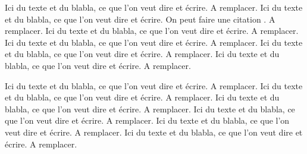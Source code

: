 Ici du texte et du blabla, ce que l'on veut dire et écrire. A remplacer. Ici du texte et du blabla, ce que l'on veut dire et écrire. On peut faire une citation \cite{Motclef1}.
A remplacer. Ici du texte et du blabla, ce que l'on veut dire et écrire. A remplacer. Ici du texte et du blabla, ce que l'on veut dire et écrire. A remplacer. Ici du texte et du blabla, ce que l'on veut dire et écrire. A remplacer. Ici du texte et du blabla, ce que l'on veut dire et écrire. A remplacer.

Ici du texte et du blabla, ce que l'on veut dire et écrire. A remplacer. Ici du texte et du blabla, ce que l'on veut dire et écrire. A remplacer.
Ici du texte et du blabla, ce que l'on veut dire et écrire. A remplacer. Ici du texte et du blabla, ce que l'on veut dire et écrire. A remplacer. Ici du texte et du blabla, ce que l'on veut dire et écrire. A remplacer. Ici du texte et du blabla, ce que l'on veut dire et écrire. A remplacer.

\clearpage
